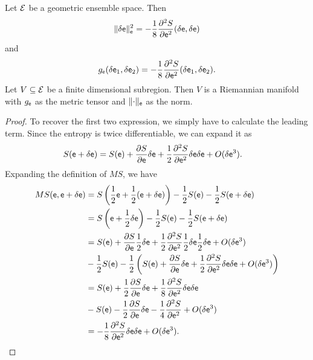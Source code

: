 \begin{thrm}
	Let $\mathcal{E}$ be a geometric ensemble space. Then
	$$ \lVert \delta \mathsf{e} \rVert_{\mathsf{e}}^2 = - \frac{1}{8} \frac{\partial^2 S}{\partial \mathsf{e}^2}(\delta \mathsf{e} , \delta \mathsf{e}) $$
	and 
	$$ g_{\mathsf{e}}( \delta \mathsf{e}_1, \delta \mathsf{e}_2 ) = - \frac{1}{8} \frac{\partial^2 S}{\partial \mathsf{e} ^2}( \delta \mathsf{e}_1, \delta \mathsf{e}_2 ).$$
	Let $V \subseteq \mathcal{E}$ be a finite dimensional subregion. Then $V$ is a Riemannian manifold with $g_{\mathsf{e}}$ as the metric tensor and $\lVert \cdot \rVert_{\mathsf{e}}$ as the norm.
\end{thrm}

\begin{proof}
	To recover the first two expression, we simply have to calculate the leading term. Since the entropy is twice differentiable, we can expand it as
\begin{equation}
	\begin{aligned}
		S(\mathsf{e} + \delta \mathsf{e}) &= S(\mathsf{e}) + \frac{\partial S}{\partial \mathsf{e}} \delta \mathsf{e} + \frac{1}{2} \frac{\partial^2 S}{\partial \mathsf{e}^2} \delta \mathsf{e} \delta \mathsf{e} + O(\delta \mathsf{e} ^3).
	\end{aligned}
\end{equation}
Expanding the definition of $MS$, we have
\begin{equation}
	\begin{aligned}
		MS(\mathsf{e}, \mathsf{e} + \delta \mathsf{e}) &= S\left(\frac{1}{2} \mathsf{e} + \frac{1}{2}(\mathsf{e} + \delta \mathsf{e}) \right) - \frac{1}{2} S(\mathsf{e}) - \frac{1}{2} S(\mathsf{e}+\delta \mathsf{e}) \\
		&=  S\left(\mathsf{e} + \frac{1}{2} \delta \mathsf{e} \right) - \frac{1}{2} S(\mathsf{e}) - \frac{1}{2} S(\mathsf{e}+\delta \mathsf{e}) \\
		&= S(\mathsf{e}) + \frac{\partial S}{\partial \mathsf{e}} \frac{1}{2}\delta \mathsf{e} + \frac{1}{2} \frac{\partial^2 S}{\partial \mathsf{e}^2} \frac{1}{2}\delta \mathsf{e} \frac{1}{2}\delta \mathsf{e} + O(\delta \mathsf{e} ^3) \\
		&- \frac{1}{2} S(\mathsf{e}) - \frac{1}{2} \left( S(\mathsf{e}) + \frac{\partial S}{\partial \mathsf{e}} \delta \mathsf{e} + \frac{1}{2} \frac{\partial^2 S}{\partial \mathsf{e}^2} \delta \mathsf{e} \delta \mathsf{e} + O(\delta \mathsf{e} ^3) \right) \\
		&= S(\mathsf{e}) + \frac{1}{2} \frac{\partial S}{\partial \mathsf{e}} \delta \mathsf{e} + \frac{1}{8} \frac{\partial^2 S}{\partial \mathsf{e}^2} \delta \mathsf{e} \delta \mathsf{e} \\
		&- S(\mathsf{e}) - \frac{1}{2} \frac{\partial S}{\partial \mathsf{e}} \delta \mathsf{e} - \frac{1}{4} \frac{\partial^2 S}{\partial \mathsf{e}^2} + O(\delta \mathsf{e} ^3) \\
		&= - \frac{1}{8} \frac{\partial^2 S}{\partial \mathsf{e}^2} \delta \mathsf{e} \delta \mathsf{e} + O(\delta \mathsf{e} ^3).
	\end{aligned}
\end{equation}


\end{proof}
